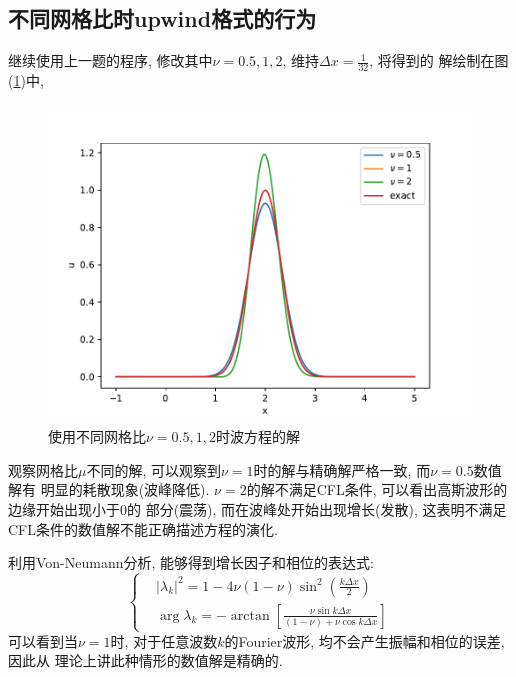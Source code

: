 \documentclass[a4paper,zihao=5,UTF8]{ctexart}
\begin{document}
	\subsection{不同网格比时upwind格式的行为}
	继续使用上一题的程序, 修改其中$\nu = 0.5, 1, 2$, 维持$\Delta x = \frac{1}{32}$, 将得到的
	解绘制在图(\ref{3-2-upwind-compare})中, 
	\begin{figure}[htbp]
		\centering
		\includegraphics[scale=0.7]{3_2_upwind_compare.pdf}
		\caption{使用不同网格比$\nu = 0.5, 1, 2$时波方程的解}
		\label{3-2-upwind-compare}
	\end{figure}
	观察网格比$\mu$不同的解, 可以观察到$\nu = 1$时的解与精确解严格一致, 而$\nu = 0.5$数值解有
	明显的耗散现象(波峰降低). $\nu = 2$的解不满足CFL条件, 可以看出高斯波形的边缘开始出现小于0的
	部分(震荡), 而在波峰处开始出现增长(发散), 这表明不满足CFL条件的数值解不能正确描述方程的演化.
	\par 
	利用Von-Neumann分析, 能够得到增长因子和相位的表达式:
	\begin{equation}
		\left\{
			\begin{aligned}
				& |\lambda_k|^2 = 1 - 4\nu(1-\nu)\sin^2\left(\frac{k\Delta x}{2}\right)\\
				&\arg\lambda_k = -\arctan\left[\frac{\nu\sin k\Delta x}{(1-\nu) + \nu\cos k\Delta x}\right]
			\end{aligned}
		\right.
	\end{equation}
	可以看到当$\nu = 1$时, 对于任意波数$k$的Fourier波形, 均不会产生振幅和相位的误差, 因此从
	理论上讲此种情形的数值解是精确的.
\end{document}
